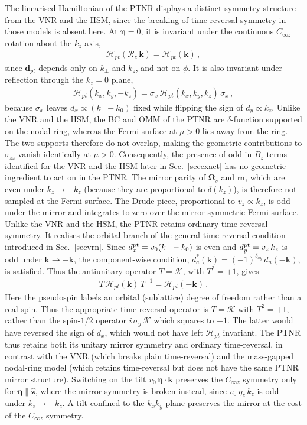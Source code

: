 \documentclass[aps,prb,onecolumn,nofootinbib,citeautoscript,10pt]{revtex4-2}
\newcommand{\bs}[1]{\boldsymbol{#1}}
\begin{document}
The linearised Hamiltonian of the PTNR displays a distinct symmetry structure
from the VNR and the HSM, since the breaking of time-reversal symmetry in those models is absent here. At $\bs \eta = 0$, it is
invariant under the continuous $C_{\infty z}$ rotation about the $k_z$-axis,
\begin{align}
\mathcal{H}_{pt}(\mathcal R_z \, \bs k) = \mathcal{H}_{pt}(\bs k)\,,
\end{align}
since $\bs d_{pt}$ depends only on $k_\perp$ and $k_z$, and not on $\phi$. It is
also invariant under reflection through the $k_z=0$ plane,
\begin{align}
\mathcal{H}_{pt}(k_x,k_y,-k_z)
=\sigma_x \, \mathcal{H}_{pt}(k_x,k_y,k_z) \, \sigma_x\,,
\end{align}
because $\sigma_x$ leaves $d_x \propto (k_\perp-k_0)$ fixed while flipping the
sign of $d_y \propto k_z$. Unlike the VNR and the HSM, the BC and OMM
of the PTNR are $\delta$-function supported on the nodal-ring, whereas the
Fermi surface at $\mu > 0$ lies away from the ring. The two supports therefore
do not overlap, making the geometric contributions to $\sigma_{zz}$ vanish
identically at $\mu > 0$. Consequently, the presence of odd-in-$B_z$ terms identified
for the VNR and the HSM later in Sec.~\ref{secexact} has no geometric ingredient to
act on in the PTNR. The mirror parity of $\bs\Omega_s$ and $\bs m$, which are
even under $k_z \rightarrow -k_z$ (because they are proportional to
$\delta(k_z)$), is therefore not sampled at the Fermi surface. The Drude piece,
proportional to $v_z \propto k_z$, is odd under the mirror and integrates to
zero over the mirror-symmetric Fermi surface. Unlike the VNR and the HSM, the PTNR retains ordinary time-reversal symmetry. It realises the orbital branch of the general time-reversal condition
introduced in Sec.~\ref{secvrn}. Since $d_x^{\rm pt}=v_0(k_\perp-k_0)$ is even
and $d_y^{\rm pt}=v_z\,k_z$ is odd under $\bs k\to-\bs k$, the component-wise
condition, $ d_a^*(\bs k)= (-1)^{\delta_{ay}}\,d_a(-\bs k)$, is satisfied. Thus the antiunitary operator $T=\mathcal K$, with
$T^2=+1$, gives
\begin{align}
T\,\mathcal{H}_{pt}(\bs k)\,T^{-1} = \mathcal{H}_{pt}(-\bs k)\,.
\end{align}
Here the pseudospin labels an orbital (sublattice) degree of freedom rather
than a real spin. Thus the appropriate time-reversal operator is $T = \mathcal K$
with $T^2 = +1$, rather than the spin-$1/2$ operator
$ i\,\sigma_y\, \mathcal K$ which squares to $ -1$. The latter would have reversed
the sign of $d_x$, which would not have left $\mathcal{H}_{pt}$ invariant.
The PTNR thus retains both its unitary mirror symmetry and ordinary time-reversal, in contrast with the VNR (which breaks plain time-reversal) and the
mass-gapped nodal-ring model (which retains time-reversal but does not have the
same PTNR mirror structure). Switching on the tilt $v_0\,\bs \eta \cdot \bs k$ preserves the
$C_{\infty z}$ symmetry only for $\bs \eta \parallel \hat{\bs z}$, where the
mirror symmetry is broken instead, since $v_0\,\eta_z\,k_z$ is odd under
$k_z \rightarrow -k_z$. A tilt confined to the $k_x k_y$-plane preserves the
mirror at the cost of the $C_{\infty z}$ symmetry.
\end{document}
